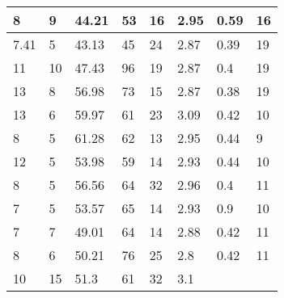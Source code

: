 \begin{longtable}{ | l | l || l | l || l | l || l | l | }
	8 & 9 & 44.21 & 53 & 16 & 2.95 & 0.59 & 16 \\ \hline
	7.41 & 5 & 43.13 & 45 & 24 & 2.87 & 0.39 & 19 \\ \hline
	11 & 10 & 47.43 & 96 & 19 & 2.87 & 0.4 & 19 \\ \hline
	13 & 8 & 56.98 & 73 & 15 & 2.87 & 0.38 & 19 \\ \hline
	13 & 6 & 59.97 & 61 & 23 & 3.09 & 0.42 & 10 \\ \hline
	8 & 5 & 61.28 & 62 & 13 & 2.95 & 0.44 & 9 \\ \hline
	12 & 5 & 53.98 & 59 & 14 & 2.93 & 0.44 & 10 \\ \hline
	8 & 5 & 56.56 & 64 & 32 & 2.96 & 0.4 & 11 \\ \hline
	7 & 5 & 53.57 & 65 & 14 & 2.93 & 0.9 & 10 \\ \hline
	7 & 7 & 49.01 & 64 & 14 & 2.88 & 0.42 & 11 \\ \hline
	8 & 6 & 50.21 & 76 & 25 & 2.8 & 0.42 & 11 \\ \hline
	10 & 15 & 51.3 & 61 & 32 & 3.1 &  & \  \\ \hline
\end{longtable}




